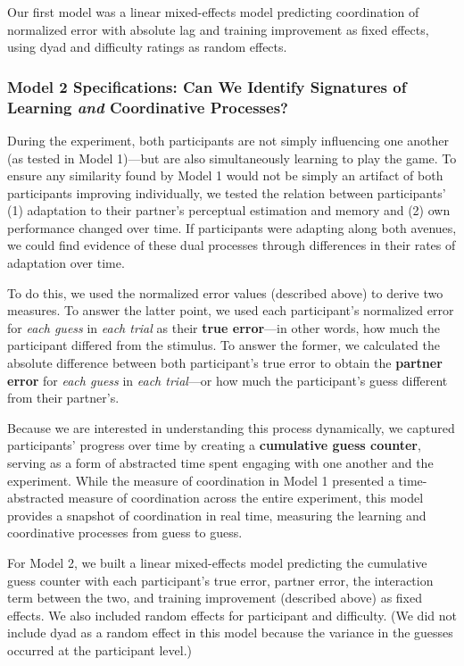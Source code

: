\documentclass[10pt, letterpaper]{article}
\begin{document}
Our first model was a linear mixed-effects model predicting coordination
of normalized error with absolute lag and training improvement as fixed
effects, using dyad and difficulty ratings as random effects.

\subsubsection{\texorpdfstring{Model 2 Specifications: Can We Identify
Signatures of Learning \emph{and} Coordinative
Processes?}{Model 2 Specifications: Can We Identify Signatures of Learning and Coordinative Processes?}}\label{model-2-specifications-can-we-identify-signatures-of-learning-and-coordinative-processes}

During the experiment, both participants are not simply influencing one
another (as tested in Model 1)---but are also simultaneously learning to
play the game. To ensure any similarity found by Model 1 would not be
simply an artifact of both participants improving individually, we
tested the relation between participants' (1) adaptation to their
partner's perceptual estimation and memory and (2) own performance
changed over time. If participants were adapting along both avenues, we
could find evidence of these dual processes through differences in their
rates of adaptation over time.

To do this, we used the normalized error values (described above) to
derive two measures. To answer the latter point, we used each
participant's normalized error for \emph{each guess} in \emph{each
trial} as their \textbf{true error}---in other words, how much the
participant differed from the stimulus. To answer the former, we
calculated the absolute difference between both participant's true error
to obtain the \textbf{partner error} for \emph{each guess} in \emph{each
trial}---or how much the participant's guess different from their
partner's.

Because we are interested in understanding this process dynamically, we
captured participants' progress over time by creating a
\textbf{cumulative guess counter}, serving as a form of abstracted time
spent engaging with one another and the experiment. While the measure of
coordination in Model 1 presented a time-abstracted measure of
coordination across the entire experiment, this model provides a
snapshot of coordination in real time, measuring the learning and
coordinative processes from guess to guess.

For Model 2, we built a linear mixed-effects model predicting the
cumulative guess counter with each participant's true error, partner
error, the interaction term between the two, and training improvement
(described above) as fixed effects. We also included random effects for
participant and difficulty. (We did not include dyad as a random effect
in this model because the variance in the guesses occurred at the
participant level.)
\end{document}

